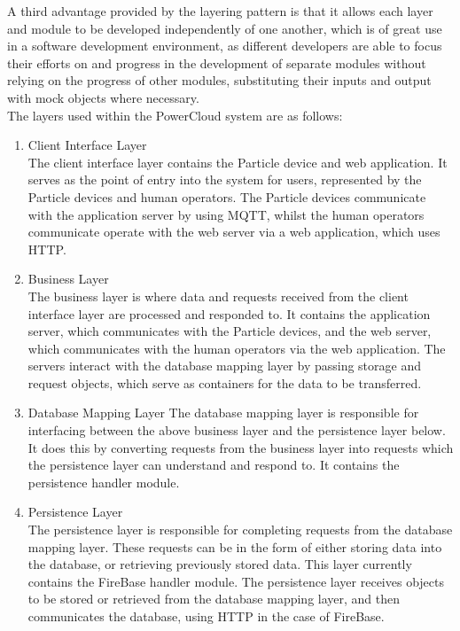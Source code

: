 \documentclass{article}
\begin{document}
A third advantage provided by the layering pattern is that it allows each 
layer and module to be developed independently of one another, which is 
of great use in a software development environment, as different 
developers are able to focus their efforts on and progress in the 
development of separate modules without relying on the progress of other 
modules, substituting their inputs and output with mock objects where 
necessary.\\

The layers used within the PowerCloud system are as follows:\\

	\begin{enumerate}
		\item Client Interface Layer\\
		The client interface layer contains the Particle device and web 
		application. It serves as the point of entry into the system for 
		users, represented by the Particle devices and human operators. 
		The Particle devices communicate with the application server by 
		using MQTT, whilst the human operators communicate operate with 
		the web server via a web application, which uses HTTP.
		\item Business Layer\\
		The business layer is where data and requests received from the 
		client interface layer are processed and responded to. It 
		contains the application server, which communicates with the 
		Particle devices, and the web server, which communicates with the 
		human operators via the web application. The servers interact 
		with the database mapping layer by passing storage and request 
		objects, which serve as containers for the data to be transferred.
		\item Database Mapping Layer
		The database mapping layer is responsible for interfacing between 
		the above business layer and the persistence layer below. It does 
		this by converting requests from the business layer into requests 
		which the persistence layer can understand and respond to. It 
		contains the persistence handler module.
		\item Persistence Layer\\
		The persistence layer is responsible for completing requests from 
		the database mapping layer. These requests can be in the form of 
		either storing data into the database, or retrieving previously 
		stored data. This layer currently contains the FireBase handler 
		module. The persistence layer receives objects to be stored or 
		retrieved from the database mapping layer, and then communicates 
		the database, using HTTP in the case of FireBase.
	\end{enumerate}
\end{document}
